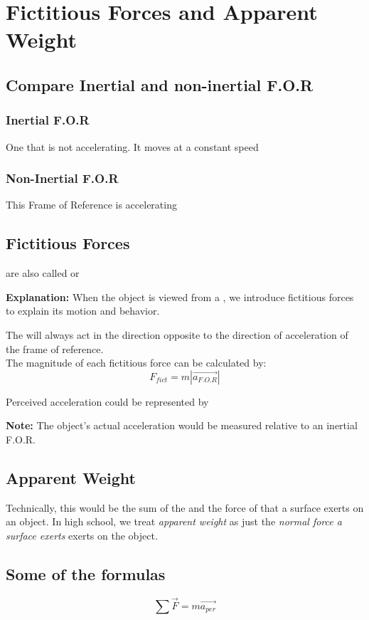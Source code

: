 \section{Fictitious Forces and Apparent Weight}
\subsection{Compare Inertial and non-inertial F.O.R}
\subsubsection{Inertial F.O.R}
One that is not accelerating. It moves at a constant speed\\

\subsubsection{Non-Inertial F.O.R}
This Frame of Reference is accelerating
\subsection{Fictitious Forces}
 are also called  or 

    \textbf{Explanation:} When the object is viewed from a , we introduce fictitious forces to explain its motion and behavior.

The  will always act in the direction opposite to the direction of acceleration of 
the frame of reference.\\

    The magnitude of each fictitious force can be calculated by:
    \[
        F_{fict} = m|\vec{a_{F.O.R}}|
    \]

Perceived acceleration could be represented by 

    \textbf{Note: } The object's actual acceleration would be measured relative to an inertial F.O.R.

\subsection{Apparent Weight}
Technically, this would be the sum of the  and the force of  that a surface exerts 
on an object. In high school, we treat \textit{apparent weight} as just the \textit{normal force a surface exerts}
exerts on the object.

\subsection{Some of the formulas}
\[
    \sum \vec{F} = m\vec{a_{per}}
\]
